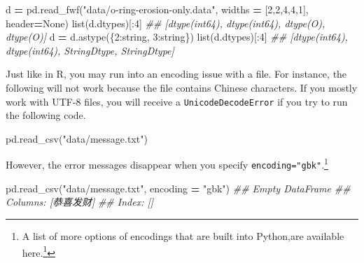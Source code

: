 \documentclass[
  12pt,
  krantz2]{krantz}
\makeatletter
\newenvironment{Shaded}{\begin{snugshade}}{\end{snugshade}}
\newcommand{\BuiltInTok}[1]{#1}
\newcommand{\CommentTok}[1]{\textcolor[rgb]{0.37,0.37,0.37}{\textit{#1}}}
\newcommand{\DecValTok}[1]{\textcolor[rgb]{0.06,0.06,0.06}{#1}}
\newcommand{\NormalTok}[1]{#1}
\newcommand{\OperatorTok}[1]{\textcolor[rgb]{0.43,0.43,0.43}{\textbf{#1}}}
\newcommand{\StringTok}[1]{\textcolor[rgb]{0.5,0.5,0.5}{#1}}
\newcommand{\VariableTok}[1]{\textcolor[rgb]{0,0,0}{#1}}
\renewcommand{\href}[2]{#2\footnote{\url{#1}}}
\newenvironment{kframe}{%
\medskip{}
\setlength{\fboxsep}{.8em}
 \def\at@end@of@kframe{}%
 \ifinner\ifhmode%
  \def\at@end@of@kframe{\end{minipage}}%
  \begin{minipage}{\columnwidth}%
 \fi\fi%
 \def\FrameCommand##1{\hskip\@totalleftmargin \hskip-\fboxsep
 \colorbox{shadecolor}{##1}\hskip-\fboxsep
     \hskip-\linewidth \hskip-\@totalleftmargin \hskip\columnwidth}%
 \MakeFramed {\advance\hsize-\width
   \@totalleftmargin\z@ \linewidth\hsize
   \@setminipage}}%
 {\par\unskip\endMakeFramed%
 \at@end@of@kframe}
\renewenvironment{Shaded}{\begin{kframe}}{\end{kframe}}
\makeatother
\begin{document}
\begin{Shaded}
\begin{Highlighting}[]
\NormalTok{d }\OperatorTok{=}\NormalTok{ pd.read\_fwf(}\StringTok{"data/o{-}ring{-}erosion{-}only.data"}\NormalTok{, }
\NormalTok{                widths }\OperatorTok{=}\NormalTok{ [}\DecValTok{2}\NormalTok{,}\DecValTok{2}\NormalTok{,}\DecValTok{4}\NormalTok{,}\DecValTok{4}\NormalTok{,}\DecValTok{1}\NormalTok{], header}\OperatorTok{=}\VariableTok{None}\NormalTok{)}
\BuiltInTok{list}\NormalTok{(d.dtypes)[:}\DecValTok{4}\NormalTok{]}
\CommentTok{\#\# [dtype(\textquotesingle{}int64\textquotesingle{}), dtype(\textquotesingle{}int64\textquotesingle{}), dtype(\textquotesingle{}O\textquotesingle{}), dtype(\textquotesingle{}O\textquotesingle{})]}
\NormalTok{d }\OperatorTok{=}\NormalTok{ d.astype(\{}\DecValTok{2}\NormalTok{:}\StringTok{\textquotesingle{}string\textquotesingle{}}\NormalTok{, }\DecValTok{3}\NormalTok{:}\StringTok{\textquotesingle{}string\textquotesingle{}}\NormalTok{\}) }
\BuiltInTok{list}\NormalTok{(d.dtypes)[:}\DecValTok{4}\NormalTok{]}
\CommentTok{\#\# [dtype(\textquotesingle{}int64\textquotesingle{}), dtype(\textquotesingle{}int64\textquotesingle{}), StringDtype, StringDtype]}
\end{Highlighting}
\end{Shaded}

Just like in R, you may run into an encoding issue with a file. For instance, the following will not work because the file contains Chinese characters. If you mostly work with UTF-8 files, you will receive a \texttt{UnicodeDecodeError} if you try to run the following code.

\begin{Shaded}
\begin{Highlighting}[]
\NormalTok{pd.read\_csv(}\StringTok{"data/message.txt"}\NormalTok{)}
\end{Highlighting}
\end{Shaded}

However, the error messages disappear when you specify \texttt{encoding="gbk"}.\footnote{A list of more options of encodings that are built into Python,are available \href{https://docs.python.org/3/library/codecs.html\#standard-encodings}{here.}}

\begin{Shaded}
\begin{Highlighting}[]
\NormalTok{pd.read\_csv(}\StringTok{"data/message.txt"}\NormalTok{, encoding }\OperatorTok{=} \StringTok{"gbk"}\NormalTok{)}
\CommentTok{\#\# Empty DataFrame}
\CommentTok{\#\# Columns: [恭喜发财]}
\CommentTok{\#\# Index: []}
\end{Highlighting}
\end{Shaded}
\end{document}
